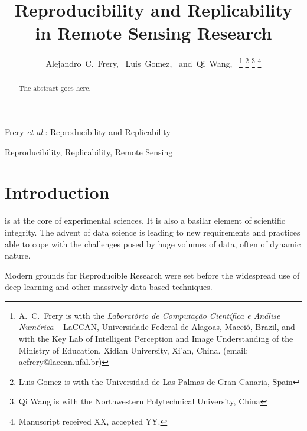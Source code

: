 \documentclass[journal,twopage]{IEEEtran}
\begin{document}
	
\title{Reproducibility and Replicability in Remote Sensing Research}
	
\author{Alejandro~C.~Frery,~
Luis~Gomez,~
and~Qi~Wang,~%
\thanks{A.\ C.\ Frery is with the \textit{Laborat\'orio de Computa\c c\~ao Cient\'ifica e An\'alise Num\'erica} -- LaCCAN, Universidade Federal de Alagoas, Macei\'o, Brazil, and with the Key Lab of Intelligent Perception and Image Understanding of the Ministry of Education, Xidian University, Xi'an, China. (email: acfrery@laccan.ufal.br)}%
\thanks{Luis Gomez is with the Universidad de Las Palmas de Gran Canaria, Spain}%
\thanks{Qi Wang is with the Northwestern Polytechnical University, China}%
\thanks{Manuscript received XX, accepted YY.}}
	
%
{Frery \MakeLowercase{\textit{et al.}}: Reproducibility and Replicability}
	
\maketitle
	
\begin{abstract}
The abstract goes here.
\end{abstract}
	
\begin{IEEEkeywords}
Reproducibility,
Replicability,
Remote Sensing
\end{IEEEkeywords}
	

\IEEEpeerreviewmaketitle

\section{Introduction}\label{Sec:Introduction}
	
 is at the core of experimental sciences. 
It is also a basilar element of scientific integrity. 
The advent of data science is leading to new requirements and practices able to cope with the challenges posed by huge volumes of data, often of dynamic nature. 
	
Modern grounds for Reproducible Research were set before the widespread use of deep learning and other massively data-based techniques. 
	
\end{document}
